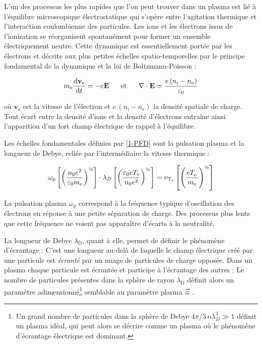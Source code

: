 \begin{refsection}
L'un des processus les plus rapides que l'on peut trouver dans un plasma est lié à
l'équilibre microscopique électrostatique qui s'opère
entre l'agitation thermique et l'interaction coulombienne des particules. Les
ions et les électrons issus de l'ionisation se réorganisent spontanément pour former un ensemble électriquement neutre.
Cette dynamique est essentiellement portée par les électrons et décrite aux plus petites
échelles spatio-temporelles par le principe fondamental de la dynamique et la loi
de Boltzmann-Poisson :

\begin{align}
\label{1-PFD}
m_\text{e}\frac{\text{d} \mathbf{v}_\text{e}}{\text{d} t}=-e\mathbf E
\;\;\;\;\;\;\text{et}\;\;\;\;\;\;
\nabla\cdot\mathbf{E}=\frac{e\,(n_\text{i}-n_\text{e})}{\varepsilon{_{0}}}
\end{align}

où $\mathbf{v}_\text{e}$ est la vitesse de l'électron et
$e\,(n_\text{i}-n_\text{e})$ la densité spatiale de charge.
Tout écart entre la densité d'ions et la densité d'électrons
entraîne ainsi l'apparition d'un fort champ électrique de rappel à l'équilibre.

Les échelles fondamentales définies par \eqref{1-PFD} sont la pulsation
plasma et la longueur de Debye, reliée par l'intermédiaire la vitesse thermique :

\begin{equation}
\omega_\text{p}\left[\left(\frac{n\indice{0}
e\puissance{2}}{\varepsilon\indice{0} m_\text{e}}\right)^{\text{\textonehalf}}
\right]\cdot\lambda_D\left[\left(\frac{\varepsilon\indice{0}
eT_\text{e}}{n\indice{0} e\puissance{2}}\right)^{\text{\textonehalf}}\right]
=v_{\text{T}_\text{e}}\left[\left(\frac{eT_\text{e}^{^{\phantom{1}}}}{m_\text{e}}\right)^{\text{\textonehalf}}\right]
\end{equation}

La pulsation plasma $\omega_\text{p}$ correspond à la fréquence typique
d'oscillation des électrons en réponse à une petite séparation de charge. Des processus plus lents que cette fréquence ne voient
pas apparaître d'écarts à la neutralité. 

La longueur de Debye $\lambda_\text{D}$, quant à elle, permet de définir le
phénomène d'écrantage :
C'est une longueur au-delà de laquelle le champ électrique créé par une particule est \emph{écranté} par 
un nuage de particules de charge opposée. Dans un plasma chaque particule est écrantée et participe
à l'écrantage des autres ; Le nombre de particules présentes
dans la sphère de rayon $\lambda_\text{D}$ définit alors un paramètre
adimensionné\footnote{Un
grand nombre de particules dans la sphère de Debye $4\pi/3\,n\lambda_D^3\gg1$
définit un plasma idéal, qui peut alors se décrire comme un plasma où le
phénomène d'écrantage électrique est dominant.} semblable au paramètre plasma $\Xi$ .


\end{refsection}
